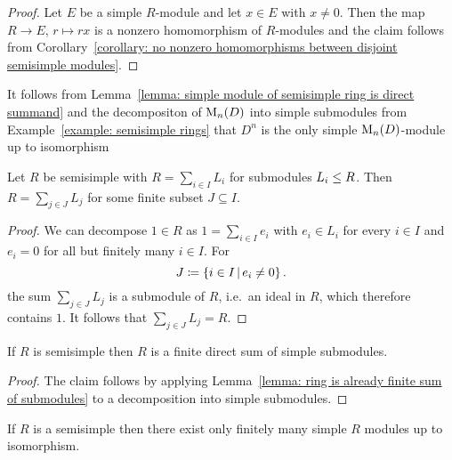 \begin{proof}
  Let $E$ be a simple $R$-module and let $x \in E$ with $x \neq 0$.
  Then the map $R \to E$, $r \mapsto rx$ is a nonzero homomorphism of $R$-modules and the claim follows from Corollary~\ref{corollary: no nonzero homomorphisms between disjoint semisimple modules}.
\end{proof}


\begin{example}
  \label{example: D^n is the only simple M_n(D)-module}
  It follows from Lemma~\ref{lemma: simple module of semisimple ring is direct summand} and the decompositon of $\operatorname{M}_n(D)$ into simple submodules from Example~\ref{example: semisimple rings} that $D^n$ is the only simple $\operatorname{M}_n(D)$-module up to isomorphism
\end{example}


\begin{lemma}
  \label{lemma: ring is already finite sum of submodules}
  Let $R$ be semisimple with $R = \sum_{i \in I} L_i$ for submodules $L_i \leq R$.
  Then $R = \sum_{j \in J} L_j$ for some finite subset $J \subseteq I$.
\end{lemma}


\begin{proof}
  We can decompose $1 \in R$ as $1 = \sum_{i \in I} e_i$ with $e_i \in L_i$ for every $i \in I$ and $e_i = 0$ for all but finitely many $i \in I$.
  For
  \[
              J
    \defined  \{ i \in I \suchthat e_i \neq 0 \} \,.
  \]
  the sum $\sum_{j \in J} L_j$ is a submodule of $R$, i.e.\ an ideal in $R$, which therefore contains $1$.
  It follows that $\sum_{j \in J} L_j = R$.
\end{proof}


\begin{corollary}
  \label{corollary: semisimple ring is already a finite sum}
  If $R$ is semisimple then $R$ is a finite direct sum of simple submodules.
\end{corollary}


\begin{proof}
 The claim follows by applying Lemma~\ref{lemma: ring is already finite sum of submodules} to a decomposition into simple submodules.
\end{proof}


\begin{corollary}
  \label{corollary: ss rings have only finitely many simple modules}
  If $R$ is a semisimple then there exist only finitely many simple $R$ modules up to isomorphism.
\end{corollary}


